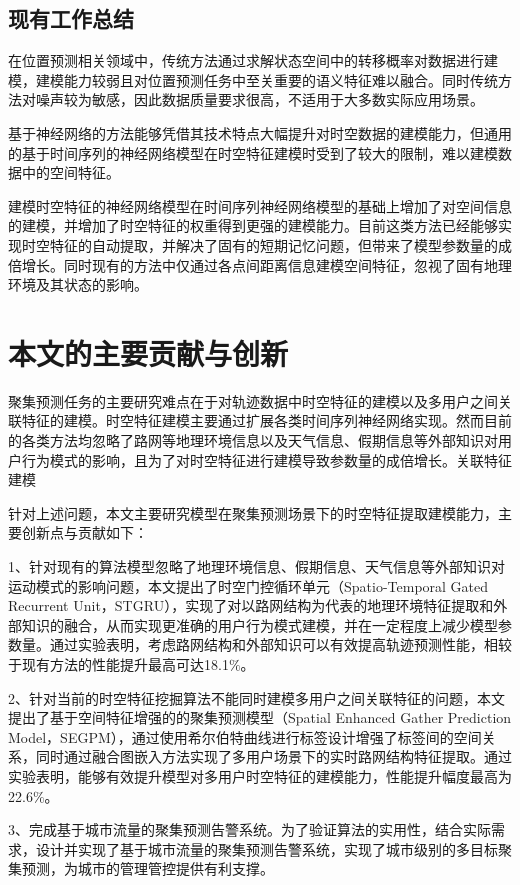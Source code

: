 \documentclass[master]{thesis-uestc}
\begin{document}
\subsection{现有工作总结}
在位置预测相关领域中，传统方法通过求解状态空间中的转移概率对数据进行建模，建模能力较弱且对位置预测任务中至关重要的语义特征难以融合。同时传统方法对噪声较为敏感，因此数据质量要求很高，不适用于大多数实际应用场景。

基于神经网络的方法能够凭借其技术特点大幅提升对时空数据的建模能力，但通用的基于时间序列的神经网络模型在时空特征建模时受到了较大的限制，难以建模数据中的空间特征。

建模时空特征的神经网络模型在时间序列神经网络模型的基础上增加了对空间信息的建模，并增加了时空特征的权重得到更强的建模能力。目前这类方法已经能够实现时空特征的自动提取，并解决了固有的短期记忆问题，但带来了模型参数量的成倍增长。同时现有的方法中仅通过各点间距离信息建模空间特征，忽视了固有地理环境及其状态的影响。

\section{本文的主要贡献与创新}
聚集预测任务的主要研究难点在于对轨迹数据中时空特征的建模以及多用户之间关联特征的建模。时空特征建模主要通过扩展各类时间序列神经网络实现。然而目前的各类方法均忽略了路网等地理环境信息以及天气信息、假期信息等外部知识对用户行为模式的影响，且为了对时空特征进行建模导致参数量的成倍增长。关联特征建模

针对上述问题，本文主要研究模型在聚集预测场景下的时空特征提取建模能力，主要创新点与贡献如下：

1、针对现有的算法模型忽略了地理环境信息、假期信息、天气信息等外部知识对运动模式的影响问题，本文提出了时空门控循环单元（Spatio-Temporal Gated Recurrent Unit，STGRU），实现了对以路网结构为代表的地理环境特征提取和外部知识的融合，从而实现更准确的用户行为模式建模，并在一定程度上减少模型参数量。通过实验表明，考虑路网结构和外部知识可以有效提高轨迹预测性能，相较于现有方法的性能提升最高可达18.1$\%$。

2、针对当前的时空特征挖掘算法不能同时建模多用户之间关联特征的问题，本文提出了基于空间特征增强的的聚集预测模型（Spatial Enhanced Gather Prediction Model，SEGPM），通过使用希尔伯特曲线进行标签设计增强了标签间的空间关系，同时通过融合图嵌入方法实现了多用户场景下的实时路网结构特征提取。通过实验表明，能够有效提升模型对多用户时空特征的建模能力，性能提升幅度最高为22.6$\%$。

3、完成基于城市流量的聚集预测告警系统。为了验证算法的实用性，结合实际需求，设计并实现了基于城市流量的聚集预测告警系统，实现了城市级别的多目标聚集预测，为城市的管理管控提供有利支撑。
\end{document}
